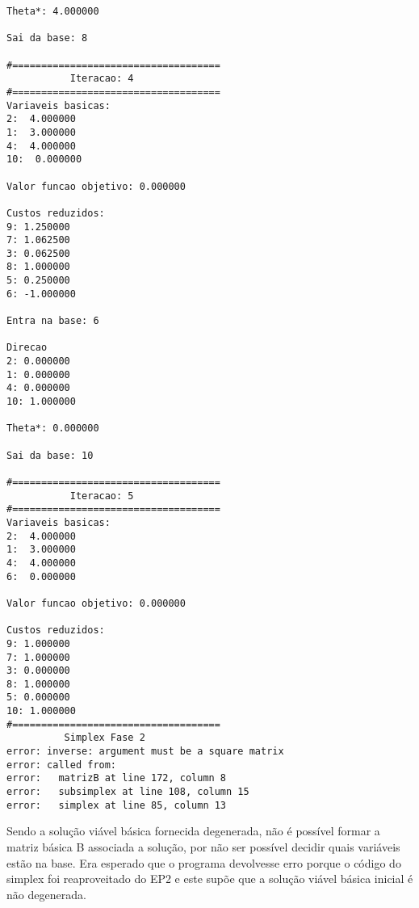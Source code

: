 \documentclass[
	12pt,				%
	openright,			%
	oneside,			%
	a4paper,			%
	english,			%
	french,				%
	spanish,			%
	brazil,				%
	]{abntex2}
\begin{document}
\begin{verbatim}
Theta*: 4.000000

Sai da base: 8

#====================================
           Iteracao: 4
#====================================
Variaveis basicas:
2:  4.000000
1:  3.000000
4:  4.000000
10:  0.000000

Valor funcao objetivo: 0.000000

Custos reduzidos:
9: 1.250000
7: 1.062500
3: 0.062500
8: 1.000000
5: 0.250000
6: -1.000000

Entra na base: 6

Direcao
2: 0.000000
1: 0.000000
4: 0.000000
10: 1.000000

Theta*: 0.000000

Sai da base: 10

#====================================
           Iteracao: 5
#====================================
Variaveis basicas:
2:  4.000000
1:  3.000000
4:  4.000000
6:  0.000000

Valor funcao objetivo: 0.000000

Custos reduzidos:
9: 1.000000
7: 1.000000
3: 0.000000
8: 1.000000
5: 0.000000
10: 1.000000
#====================================
          Simplex Fase 2
error: inverse: argument must be a square matrix
error: called from:
error:   matrizB at line 172, column 8
error:   subsimplex at line 108, column 15
error:   simplex at line 85, column 13
\end{verbatim}
 
Sendo a solução viável básica fornecida degenerada, não é possível formar a matriz básica B associada a solução, por não ser possível decidir quais variáveis estão na base. Era esperado que o programa devolvesse erro porque o código do simplex foi reaproveitado do EP2 e este supõe que a solução viável básica inicial é não degenerada.
 
%
%
%
%
\end{document}
